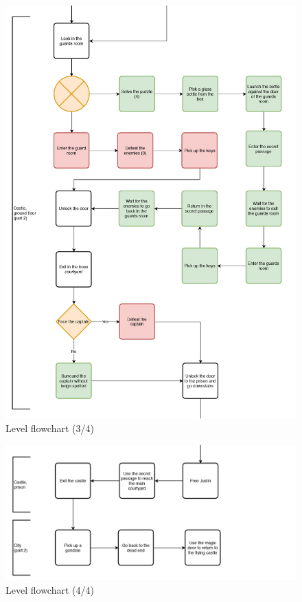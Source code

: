 \begin{figure}[H]
  \centering
  \includegraphics[width=13cm]{Images/Diagrams/dynamia_3}
  \caption{Level flowchart (3/4)}
\end{figure}

\begin{figure}[H]
  \centering
  \includegraphics[width=13cm]{Images/Diagrams/dynamia_4}
  \caption{Level flowchart (4/4)}
\end{figure}

